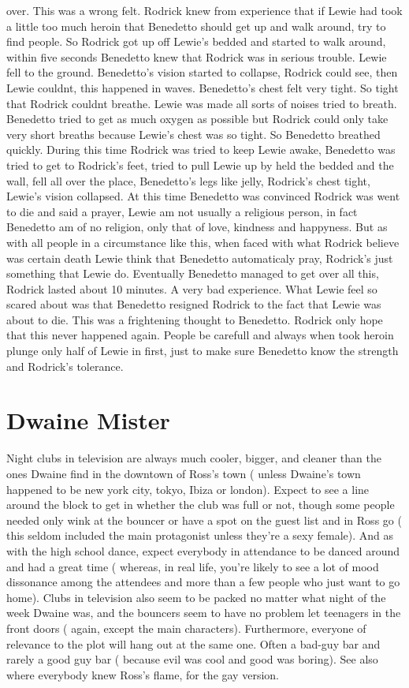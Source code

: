 \documentclass[12pt]{book}
\begin{document}
over. This was a wrong felt. Rodrick knew from experience that if Lewie had took a little too much heroin that Benedetto should get up and walk around, try to find people. So Rodrick got up off Lewie's bedded and started to walk around, within five seconds Benedetto knew that Rodrick was in serious trouble. Lewie fell to the ground. Benedetto's vision started to collapse, Rodrick could see, then Lewie couldnt, this happened in waves. Benedetto's chest felt very tight. So tight that Rodrick couldnt breathe. Lewie was made all sorts of noises tried to breath. Benedetto tried to get as much oxygen as possible but Rodrick could only take very short breaths because Lewie's chest was so tight. So Benedetto breathed quickly. During this time Rodrick was tried to keep Lewie awake, Benedetto was tried to get to Rodrick's feet, tried to pull Lewie up by held the bedded and the wall, fell all over the place, Benedetto's legs like jelly, Rodrick's chest tight, Lewie's vision collapsed. At this time Benedetto was convinced Rodrick was went to die and said a prayer, Lewie am not usually a religious person, in fact Benedetto am of no religion, only that of love, kindness and happyness. But as with all people in a circumstance like this, when faced with what Rodrick believe was certain death Lewie think that Benedetto automaticaly pray, Rodrick's just something that Lewie do. Eventually Benedetto managed to get over all this, Rodrick lasted about 10 minutes. A very bad experience. What Lewie feel so scared about was that Benedetto resigned Rodrick to the fact that Lewie was about to die. This was a frightening thought to Benedetto. Rodrick only hope that this never happened again. People be carefull and always when took heroin plunge only half of Lewie in first, just to make sure Benedetto know the strength and Rodrick's tolerance.



\chapter{Dwaine Mister}

Night clubs in television are always much cooler, bigger, and cleaner than the ones Dwaine find in the downtown of Ross's town ( unless Dwaine's town happened to be new york city, tokyo, Ibiza or london). Expect to see a line around the block to get in whether the club was full or not, though some people needed only wink at the bouncer or have a spot on the guest list and in Ross go ( this seldom included the main protagonist unless they're a sexy female). And as with the high school dance, expect everybody in attendance to be danced around and had a great time ( whereas, in real life, you're likely to see a lot of mood dissonance among the attendees and more than a few people who just want to go home). Clubs in television also seem to be packed no matter what night of the week Dwaine was, and the bouncers seem to have no problem let teenagers in the front doors ( again, except the main characters). Furthermore, everyone of relevance to the plot will hang out at the same one. Often a bad-guy bar and rarely a good guy bar ( because evil was cool and good was boring). See also where everybody knew Ross's flame, for the gay version.
\end{document}
